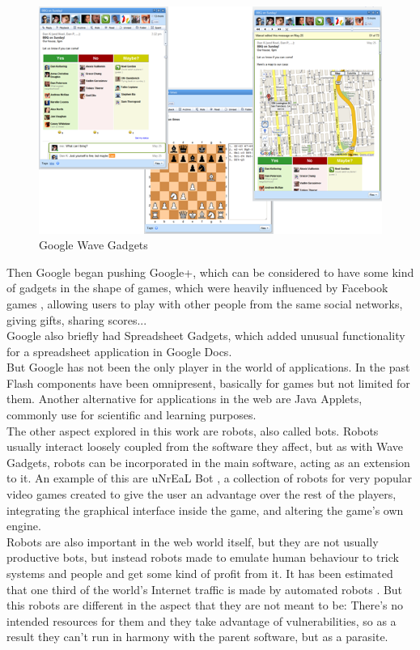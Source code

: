 \begin{figure}[h]
  \center
    \includegraphics[keepaspectratio, scale=0.5]{Media/Captures/Soa/WaveGadgets.png}
  \caption{Google Wave Gadgets}
  \label{fig:wave_gadgets}
\end{figure}
Then Google began pushing Google+, which can be considered to have some kind of gadgets in the shape of games, which were heavily influenced by Facebook games \cite{ref:facebook_games}, allowing users to play with other people from the same social networks, giving gifts, sharing scores...\\[.2cm]
Google also briefly had Spreadsheet Gadgets, which added unusual functionality for a spreadsheet application in Google Docs.\\[.2cm]
But Google has not been the only player in the world of applications. In the past Flash components have been omnipresent, basically for games but not limited for them. Another alternative for applications in the web are Java Applets, commonly use for scientific and learning purposes.\\[.2cm]
The other aspect explored in this work are robots, also called bots. Robots usually interact loosely coupled from the software they affect, but as with Wave Gadgets, robots can be incorporated in the main software, acting as an extension to it. An example of this are uNrEaL Bot \cite{ref:unreal_bot}, a collection of robots for very popular video games created to give the user an advantage over the rest of the players, integrating the graphical interface inside the game, and altering the game's own engine.\\[.2cm]
Robots are also important in the web world itself, but they are not usually productive bots, but instead robots made to emulate human behaviour to trick systems and people and get some kind of profit from it. It has been estimated that one third of the world's Internet traffic is made by automated robots \cite{ref:robots_in_the_web}. But this robots are different in the aspect that they are not meant to be: There's no intended resources for them and they take advantage of vulnerabilities, so as a result they can't run in harmony with the parent software, but as a parasite.

